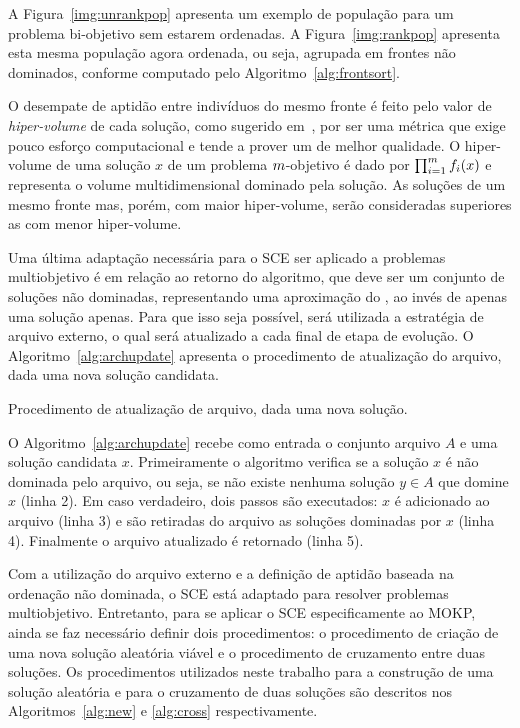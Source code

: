 A Figura~\ref{img:unrankpop} apresenta um exemplo de população
para um problema bi-objetivo sem estarem ordenadas.
A Figura~\ref{img:rankpop} apresenta esta mesma população agora ordenada, ou seja, agrupada em frontes não dominados, conforme computado pelo Algoritmo~\ref{alg:frontsort}.

O desempate de aptidão entre indivíduos do mesmo fronte é feito pelo
valor de \emph{hiper-volume} de cada solução, como sugerido em~\cite{auger2012hypervolume}, por ser uma métrica
que exige pouco esforço computacional e tende a prover um \paretoset{} de melhor qualidade.
O hiper-volume de uma solução $x$ de um problema $m$-objetivo
é dado por $\prod_{i=1}^{m} f_i(x)$ e representa o volume multidimensional
dominado pela solução.
As soluções de um mesmo fronte mas, porém, com maior hiper-volume, serão consideradas
superiores as com menor hiper-volume. 

Uma última adaptação necessária para o SCE ser aplicado a problemas multiobjetivo
é em relação ao retorno do algoritmo, que deve ser um conjunto de soluções não dominadas,
representando uma aproximação do \paretoset{}, ao invés de apenas uma solução apenas.
Para que isso seja possível, será utilizada a estratégia de arquivo externo,
o qual será atualizado a cada final de etapa de evolução.
O Algoritmo~\ref{alg:archupdate} apresenta o procedimento de atualização do arquivo,
dada uma nova solução candidata.

\begin{algorithm}
  
  \caption{Procedimento de atualização de arquivo, dada uma nova solução.}
  \label{alg:archupdate}
\end{algorithm}

O Algoritmo~\ref{alg:archupdate} recebe como entrada o conjunto arquivo $A$ e uma solução
candidata $x$.
Primeiramente o algoritmo verifica se a solução $x$ é não dominada pelo arquivo, ou seja,
se não existe nenhuma solução $y \in A$ que domine $x$ (linha 2).
Em caso verdadeiro, dois passos são executados: $x$ é adicionado ao arquivo (linha 3) e
são retiradas do arquivo as soluções dominadas por $x$ (linha 4).
Finalmente o arquivo atualizado é retornado (linha 5).

Com a utilização do arquivo externo e a definição de aptidão baseada na ordenação
não dominada, o SCE está adaptado para resolver problemas multiobjetivo.
Entretanto, para se aplicar o SCE especificamente ao MOKP, ainda se faz necessário
definir dois procedimentos: o procedimento de criação de uma nova solução aleatória viável
e o procedimento de cruzamento entre duas soluções.
Os procedimentos utilizados neste trabalho para a construção de uma solução aleatória e
para o cruzamento de duas soluções são descritos nos Algoritmos~\ref{alg:new}
e \ref{alg:cross} respectivamente.

